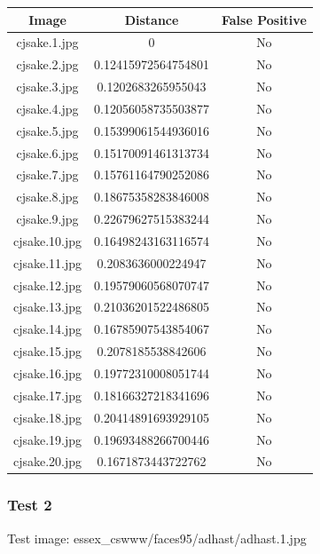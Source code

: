 \documentclass[12pt]{article}
\begin{document}
\begin{center}
\begin{tabular}{ccc}
Image & Distance & False Positive \\
\hline
cjsake.1.jpg & 0 & No \\
cjsake.2.jpg & 0.12415972564754801 & No \\
cjsake.3.jpg & 0.1202683265955043 & No \\
cjsake.4.jpg & 0.12056058735503877 & No \\
cjsake.5.jpg & 0.15399061544936016 & No \\
cjsake.6.jpg & 0.15170091461313734 & No \\
cjsake.7.jpg & 0.15761164790252086 & No \\
cjsake.8.jpg & 0.18675358283846008 & No \\
cjsake.9.jpg & 0.22679627515383244 & No \\
cjsake.10.jpg & 0.16498243163116574 & No \\
cjsake.11.jpg & 0.2083636000224947 & No \\
cjsake.12.jpg & 0.19579060568070747 & No \\
cjsake.13.jpg & 0.21036201522486805 & No \\
cjsake.14.jpg & 0.16785907543854067 & No \\
cjsake.15.jpg & 0.2078185538842606 & No \\
cjsake.16.jpg & 0.19772310008051744 & No \\
cjsake.17.jpg & 0.18166327218341696 & No \\
cjsake.18.jpg & 0.20414891693929105 & No \\
cjsake.19.jpg & 0.19693488266700446 & No \\
cjsake.20.jpg & 0.1671873443722762 & No \\
\end{tabular}
\end{center}

\newpage
\subsubsection{Test 2}
Test image: essex\_cswww/faces95/adhast/adhast.1.jpg
\end{document}

